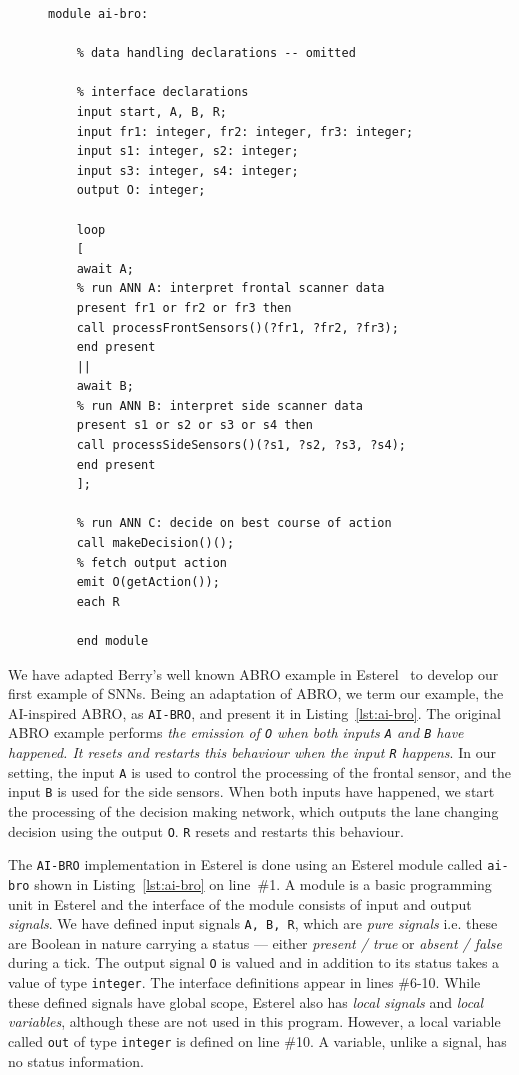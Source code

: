 \begin{figure}[h]
	\begin{lstlisting}[caption={Esterel implementation of \texttt{AI-BRO}},label={lst:ai-bro}]
	module ai-bro:
	
	% data handling declarations -- omitted 
	
	% interface declarations
	input start, A, B, R;
	input fr1: integer, fr2: integer, fr3: integer;
	input s1: integer, s2: integer;
	input s3: integer, s4: integer;
	output O: integer;
	
	loop
	[
	await A;
	% run ANN A: interpret frontal scanner data
	present fr1 or fr2 or fr3 then
	call processFrontSensors()(?fr1, ?fr2, ?fr3);
	end present
	||
	await B;
	% run ANN B: interpret side scanner data
	present s1 or s2 or s3 or s4 then
	call processSideSensors()(?s1, ?s2, ?s3, ?s4);
	end present
	];
	
	% run ANN C: decide on best course of action 
	call makeDecision()();
	% fetch output action
	emit O(getAction());
	each R
	
	end module
	\end{lstlisting}
\end{figure}

We have adapted Berry's well known ABRO example in Esterel~\cite{berry2000foundations} to develop our first example of 
\acp{SNN}. Being an adaptation of ABRO, we term our example, the AI-inspired ABRO, as \texttt{AI-BRO}, and present it in Listing~\ref{lst:ai-bro}.
The original ABRO example performs \emph{the emission of \texttt{O} when both inputs \texttt{A} and \texttt{B} 
	have happened. It resets and restarts this behaviour when the input \texttt{R} happens}. In our setting, the input 
\texttt{A} is used to control the processing of the frontal sensor, and the input \texttt{B} is used for the side sensors.
When both inputs have happened, we start the processing of the decision making network, which outputs the 
lane changing decision using the output \texttt{O}. \texttt{R} resets and restarts this behaviour.

The \texttt{AI-BRO} implementation in Esterel is done using an Esterel module called \texttt{ai-bro} shown in Listing~\ref{lst:ai-bro} on line~\#1.
A module is a basic programming unit in Esterel and the interface of the module consists of input and
output \emph{signals}. We have defined input signals \texttt{A, B, R}, which are \emph{pure signals}
i.e. these are Boolean in nature carrying a status --- either \emph{present / true} or \emph{absent / false} during a tick. The output signal 
\texttt{O} is valued and in addition to its status takes a value of type \texttt{integer}. The interface definitions appear in 
lines \#6-10. While these defined signals have global scope, Esterel also has \emph{local signals} and \emph{local variables}, although these are not used in this 
	program. However, a local variable called \texttt{out} of type \texttt{integer} is defined on line \#10.
A variable, unlike a signal, has no status information. 

